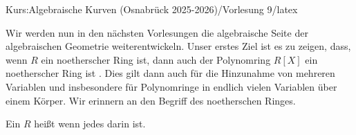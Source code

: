 Kurs:Algebraische Kurven (Osnabrück 2025-2026)/Vorlesung 9/latex
\setcounter{section}{9}








Wir werden nun in den nächsten Vorlesungen die algebraische Seite der algebraischen Geometrie weiterentwickeln. Unser erstes Ziel ist es zu zeigen, dass, wenn $R$ ein noetherscher Ring ist, dann auch der Polynomring $R[X]$ ein noetherscher Ring ist
 {} {.}
Dies gilt dann auch für die Hinzunahme von mehreren
 {} {}
Variablen und insbesondere für Polynomringe in endlich vielen Variablen über einem Körper. Wir erinnern an den Begriff des noetherschen Ringes.



{}
{




Ein
$R$ heißt  wenn jedes
darin
ist.




}






